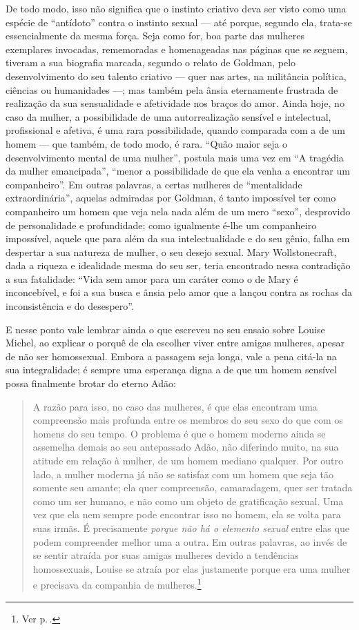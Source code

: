 De todo modo, isso não significa que o instinto
criativo deva ser visto como uma espécie de ``antídoto'' contra o
instinto sexual --- até porque, segundo ela, trata-se essencialmente da
mesma força. Seja como for, boa parte das mulheres exemplares invocadas,
rememoradas e homenageadas nas páginas que se seguem, tiveram a sua
biografia marcada, segundo o relato de Goldman, pelo desenvolvimento do
seu talento criativo --- quer nas artes, na militância política, ciências
ou humanidades ---; mas também pela ânsia eternamente frustrada de
realização da sua sensualidade e afetividade nos braços do amor. Ainda
hoje, no caso da mulher, a possibilidade de uma autorrealização sensível
e intelectual, profissional e afetiva, é uma rara possibilidade, quando
comparada com a de um homem --- que também, de todo modo, é rara. ``Quão
maior seja o desenvolvimento mental de uma mulher'', postula mais uma
vez em ``A tragédia da mulher emancipada'', ``menor a possibilidade de
que ela venha a encontrar um companheiro''. Em outras palavras, a certas
mulheres de ``mentalidade extraordinária'', aquelas admiradas por
Goldman, é tanto impossível ter como companheiro um homem que veja nela
nada além de um mero ``sexo'', desprovido de personalidade e
profundidade; como igualmente é-lhe um companheiro impossível, aquele
que para além da sua intelectualidade e do seu gênio, falha em despertar
a sua natureza de mulher, o seu desejo sexual. Mary Wollstonecraft, dada
a riqueza e idealidade mesma do seu ser, teria encontrado nessa
contradição a sua fatalidade: ``Vida sem amor para um caráter como o de
Mary é inconcebível, e foi a sua busca e ânsia pelo amor que a lançou
contra as rochas da inconsistência e do desespero''.


E nesse ponto vale lembrar ainda o que
escreveu no seu ensaio sobre Louise Michel, ao explicar o porquê de ela
escolher viver entre amigas mulheres, apesar de não ser homossexual.
Embora a passagem seja longa, vale a pena citá-la na sua integralidade;
é sempre uma esperança digna a de que um homem sensível possa finalmente
brotar do eterno Adão:

\begin{quote}
A razão para isso, no caso das mulheres, é que elas encontram uma
compreensão mais profunda entre os membros do seu sexo do que
com os homens do seu tempo. O problema é que o homem moderno ainda se
assemelha demais ao seu antepassado Adão, não diferindo muito, na sua
atitude em relação à mulher, de um homem mediano qualquer. Por outro
lado, a mulher moderna já não se satisfaz com um homem que seja tão
somente seu amante; ela quer compreensão, camaradagem, quer ser tratada
como um ser humano, e não como um objeto de gratificação sexual. Uma vez
que ela nem sempre pode encontrar isso no homem, ela se volta para suas
irmãs. É precisamente \emph{porque não há o elemento sexual} entre elas
que podem compreender melhor uma a outra. Em outras palavras, ao
invés de se sentir atraída por suas amigas mulheres devido a
tendências homossexuais, Louise se atraía por elas justamente porque era
uma mulher e precisava da companhia de mulheres.\footnote{Ver p.\,\pageref{louise}.}
\end{quote}

